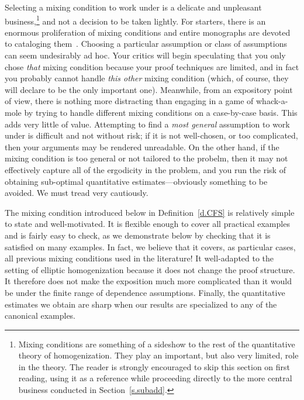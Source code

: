 \documentclass[11pt]{article} %
\numberwithin{equation}{section}
\theoremstyle{definition}
\begin{document}
\smallskip

Selecting a mixing condition to work under is a delicate and unpleasant business,\footnote{Mixing conditions are something of a sideshow to the rest of the quantitative theory of homogenization. They play an important, but also very limited, role in the theory. The reader is strongly encouraged to skip this section on first reading, using it as a reference while proceeding directly to the more central business conducted in Section~\ref{s.subadd}.} and not a decision to be taken lightly. For starters, there is an enormous proliferation of mixing conditions and entire monographs are devoted to cataloging them~\cite{Brad,B1,Torq}.
Choosing a particular assumption or class of assumptions can seem  undesirably ad hoc. Your critics will begin speculating that you only chose \emph{that} mixing condition because your proof techniques are limited, and in fact you probably cannot handle \emph{this other} mixing condition (which, of course, they will declare to be the only important one). 
Meanwhile, from an expository point of view, there is nothing more distracting  than engaging in a game of whack-a-mole by trying to handle different mixing conditions on a case-by-case basis. This adds very little of value. 
Attempting to find a \emph{most general} assumption to work under is difficult and not without risk; if it is not well-chosen, or too complicated, then your arguments may be rendered unreadable. 
On the other hand, if the mixing condition is too general or not tailored to the probelm, then it may not effectively capture all of the ergodicity in the problem, and you run the risk of obtaining sub-optimal quantitative estimates---obviously something to be avoided. 
We must tread very cautiously.

\smallskip

The mixing condition introduced below in Definition~\ref{d.CFS} 
is relatively simple to state and well-motivated. It is flexible enough to cover all practical examples and is fairly easy to check, as we demonstrate below by checking that it is satisfied on many examples. In fact, we believe that it covers, as particular cases, all previous mixing conditions used in the literature! It well-adapted to the setting of elliptic homogenization because it does not change the proof structure. It therefore does not make the exposition much more complicated than it would be under the finite range of dependence assumptions. Finally, the quantitative estimates we obtain are sharp when our results are specialized to any of the canonical examples. 
\end{document}
